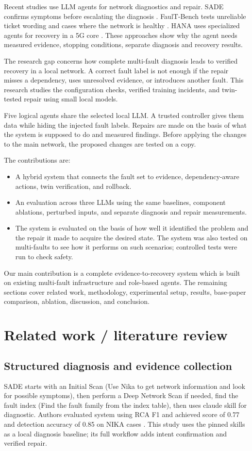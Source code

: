 \documentclass[pdflatex,sn-mathphys-num,iicol]{sn-jnl}
\begin{document}
Recent studies use LLM agents for network diagnostics and repair. SADE confirms symptoms before escalating the diagnosis \cite{sade}. FaulT-Bench tests unreliable ticket wording and cases where the network is healthy \cite{faultbench}. HANA uses specialized agents for recovery in a 5G core \cite{hana}. These approaches show why the agent needs measured evidence, stopping conditions, separate diagnosis and recovery results.

The research gap concerns how complete multi-fault diagnosis leads to verified recovery in a local network. A correct fault label is not enough if the repair misses a dependency, uses unresolved evidence, or introduces another fault. This research studies the configuration checks, verified training incidents, and twin-tested repair using small local models.

Five logical agents share the selected local LLM. A trusted controller gives them data while hiding the injected fault labels. Repairs are made on the basis of what the system is supposed to do and measured findings. Before applying the changes to the main network, the proposed changes are tested on a copy.

The contributions are:
\begin{itemize}
\item A hybrid system that connects the fault set to evidence, dependency-aware actions, twin verification, and rollback.
\item An evaluation across three LLMs using the same baselines, component ablations, perturbed inputs, and separate diagnosis and repair measurements.
\item The system is evaluated on the basis of how well it identified the problem and the repair it made to acquire the desired state. The system was also tested on multi-faults to see how it performs on such scenarios; controlled tests were run to check safety.
\end{itemize}
Our main contribution is a complete evidence-to-recovery system which is built on existing multi-fault infrastructure and role-based agents. The remaining sections cover related work, methodology, experimental setup, results, base-paper comparison, ablation, discussion, and conclusion.

\section{Related work / literature review}\label{sec:related}
\subsection{Structured diagnosis and evidence collection}
SADE starts with an Initial Scan (Use Nika to get network information and look for possible symptoms), then perform a Deep Network Scan if needed, find the fault index (Find the fault family from the index table), then uses claude skill for diagnostic. Authors evaluated system using RCA F1 and  achieved score of 0.77 and detection accuracy of 0.85 on NIKA cases \cite{sade}. This study uses the pinned skills as a local diagnosis baseline; its full workflow adds intent confirmation and verified repair.
\end{document}
